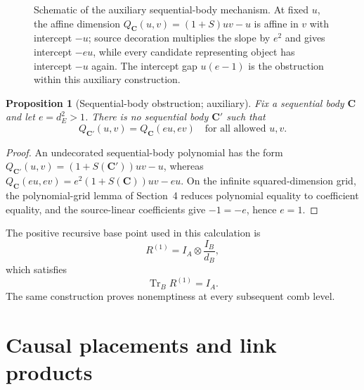 \documentclass[11pt,a4paper]{article}
\theoremstyle{definition}
\theoremstyle{plain}
\newtheorem{proposition}[theorem]{Proposition}
\theoremstyle{remark}
\DeclareMathOperator{\Tr}{Tr}
\begin{document}
\begin{figure}[ht]
\centering
{}
\caption{Schematic of the auxiliary sequential-body mechanism. At fixed $u$, the affine dimension $Q_{\mathbf C}(u,v)=(1+S)uv-u$ is affine in $v$ with intercept $-u$; source decoration multiplies the slope by $e^2$ and gives intercept $-eu$, while every candidate representing object has intercept $-u$ again. The intercept gap $u(e-1)$ is the obstruction within this auxiliary construction.}
\label{fig:intercept}
\end{figure}

\begin{proposition}[Sequential-body obstruction; auxiliary]
Fix a sequential body $\mathbf C$ and let $e=d_E^2>1$. There is no
sequential body $\mathbf C'$ such that
\[
Q_{\mathbf C'}(u,v)=Q_{\mathbf C}(eu,ev)
\quad\text{for all allowed }u,v.
\]
\end{proposition}
\begin{proof}
An undecorated sequential-body polynomial has the form
$Q_{\mathbf C'}(u,v)=(1+S(\mathbf C'))uv-u$, whereas
$Q_{\mathbf C}(eu,ev)=e^2(1+S(\mathbf C))uv-eu$. On the infinite
squared-dimension grid, the polynomial-grid lemma of Section~4 reduces
polynomial equality to coefficient equality, and the source-linear
coefficients give $-1=-e$, hence $e=1$.
\end{proof}

The positive recursive base point used in this calculation is
\[
R^{(1)}=I_A\otimes\frac{I_B}{d_B},
\]
which satisfies
\[
\Tr_B R^{(1)}=I_A.
\]
The same construction proves nonemptiness at every subsequent comb level.

\section{Causal placements and link products}
\label{app:placements}
\end{document}

